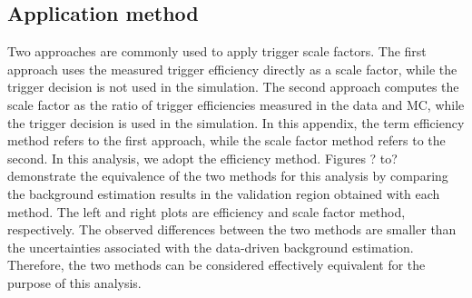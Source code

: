 \documentclass[twoside]{article}
\begin{document}
\subsection{Application method}
Two approaches are commonly used to apply trigger scale factors. The first approach uses the measured trigger efficiency directly as a scale factor, while the trigger decision is not used in the simulation. The second approach computes the scale factor as the ratio of trigger efficiencies measured in the data and MC, while the trigger decision is used in the simulation. In this appendix, the term efficiency method refers to the first approach, while the scale factor method refers to the second. In this analysis, we adopt the efficiency method.
Figures ? to? demonstrate the equivalence of the two methods for this analysis by comparing the background estimation results in the validation region obtained with each method. The left and right plots are efficiency and scale factor method, respectively. The observed differences between the two methods are smaller than the uncertainties associated with the data-driven background estimation. Therefore, the two methods can be considered effectively equivalent for the purpose of this analysis.
\end{document}
